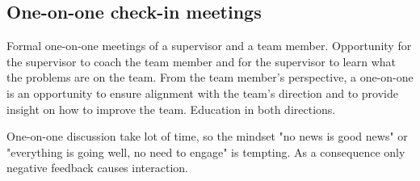 \subsection{One-on-one check-in meetings}


Formal one-on-one meetings of a supervisor and a team member. Opportunity for the supervisor to coach the team member and for the supervisor to learn what the problems are on the team. From the team member's perspective, a one-on-one is an opportunity to ensure alignment with the team's direction and to provide insight on how to improve the team. Education in both directions. 

One-on-one discussion take lot of time, so the mindset "no news is good news" or "everything is going well, no need to engage" is tempting. As a consequence only negative feedback causes interaction. 


